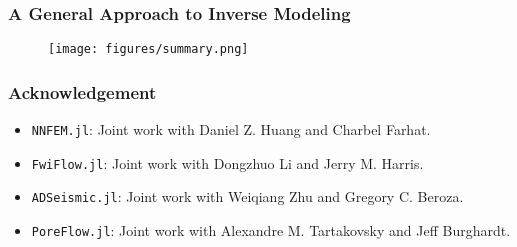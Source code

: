\documentclass[usenames,dvipsnames]{beamer}
\begin{document}
\begin{frame}
	\frametitle{A General Approach to Inverse Modeling}
	\begin{figure}[hbt]
  \texttt{[image: figures/summary.png]}
\end{figure}

\end{frame}

\begin{frame}
	\frametitle{Acknowledgement}
	\begin{itemize}
		\item \texttt{NNFEM.jl}: Joint work with Daniel Z. Huang and Charbel Farhat.
		\item \texttt{FwiFlow.jl}: Joint work with Dongzhuo Li and Jerry M. Harris. 
		\item \texttt{ADSeismic.jl}: Joint work with Weiqiang Zhu and Gregory C. Beroza. 
		\item \texttt{PoreFlow.jl}: Joint work with Alexandre M. Tartakovsky and Jeff Burghardt.
	\end{itemize}
	
\end{frame}



\end{document}
